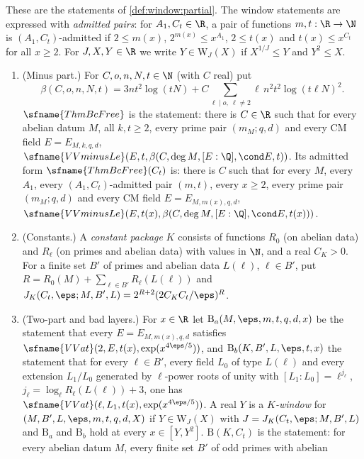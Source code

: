 These are the statements of \cref{def:window:partial}. The window statements are expressed with \emph{admitted pairs}:
for $A_1,C_t\in\R$, a pair of functions $m,t:\R\to\N$ is $(A_1,C_t)$-admitted if $2\le m(x)$, $2^{m(x)}\le x^{A_1}$,
$2\le t(x)$ and $t(x)\le x^{C_t}$ for all $x\ge2$. For $J,X,Y\in\R$ we write $Y\in\mathrm{W}_J(X)$ if $X^{1/J}\le Y$
and $Y^2\le X$.

\begin{definition}\label{pf:vwin:stmtdef}
\begin{enumerate}[label=(\alph*)]
\item\label{pf:vwin:stmt-minus} (Minus part.) For $C,o,n,N,t\in\N$ (with $C$ real) put
\[
 \beta(C,o,n,N,t)=3nt^2\log(tN)+C\sum_{\ell\mid o,\ \ell\ne2}\ell\,n^2t^2\log(t\ell N)^2 .
\]
$\sfname{ThmBcFree}$ is the statement: there is $C\in\R$ such that for every abelian datum $M$, all $k,t\ge2$, every
prime pair $(m_M;q,d)$ and every CM field $E=E_{M,k,q,d}$, $\sfname{VVminusLe}(E,t,\beta(C,\deg M,[E:\Q],\cond E,t))$.
Its admitted form $\sfname{ThmBcFree}(C_t)$ is: there is $C$ such that for every $M$, every $A_1$, every
$(A_1,C_t)$-admitted pair $(m,t)$, every $x\ge2$, every prime pair $(m_M;q,d)$ and every CM field $E=E_{M,m(x),q,d}$,
$\sfname{VVminusLe}(E,t(x),\beta(C,\deg M,[E:\Q],\cond E,t(x)))$.
\item\label{pf:vwin:stmt-const} (Constants.) A \emph{constant package} $K$ consists of functions $R_0$ (on abelian data) and
$R_\ell$ (on primes and abelian data) with values in $\N$, and a real $C_K>0$. For a finite set $B'$ of primes and abelian
data $L(\ell)$, $\ell\in B'$, put $R=R_0(M)+\sum_{\ell\in B'}R_\ell(L(\ell))$ and
$J_K(C_t,\eps;M,B',L)=2^{R+2}(2C_KC_t/\eps)^R$.
\item\label{pf:vwin:stmt-bab} (Two-part and bad layers.) For $x\in\R$ let $\mathrm{B}_a(M,\eps,m,t,q,d,x)$ be the statement that
every $E=E_{M,m(x),q,d}$ satisfies $\sfname{VVat}(2,E,t(x),\exp(x^{4\eps/5}))$, and $\mathrm{B}_b(K,B',L,\eps,t,x)$ the statement
that for every $\ell\in B'$, every field $L_0$ of type $L(\ell)$ and every extension $L_1/L_0$ generated by $\ell$-power
roots of unity with $[L_1:L_0]=\ell^{j_\ell}$, $j_\ell=\log_\ell R_\ell(L(\ell))+3$, one has
$\sfname{VVat}(\ell,L_1,t(x),\exp(x^{4\eps/5}))$. A real $Y$ is a \emph{$K$-window} for $(M,B',L,\eps,m,t,q,d,X)$ if
$Y\in\mathrm{W}_J(X)$ with $J=J_K(C_t,\eps;M,B',L)$ and $\mathrm{B}_a$ and $\mathrm{B}_b$ hold at every $x\in[Y,Y^2]$.
$\mathrm{B}(K,C_t)$ is the statement: for every abelian datum $M$, every finite set $B'$ of odd primes with abelian

\end{enumerate}
\end{definition}
